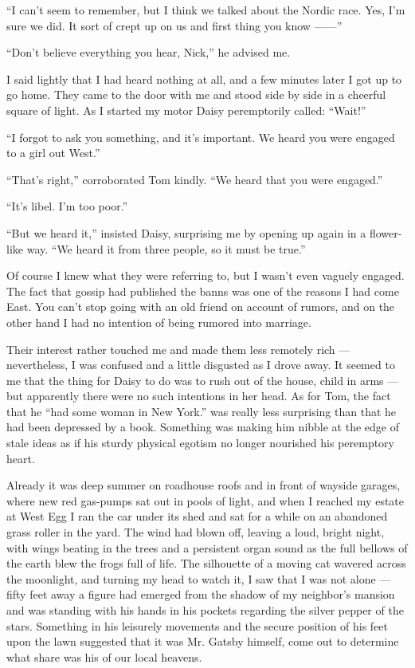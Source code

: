 \documentclass{znotebook}
\begin{document}
``I can't seem to remember, but I think we talked about the Nordic race. Yes, I'm sure we did. It sort of crept up on us and first thing you know ——''

``Don't believe everything you hear, Nick,'' he advised me.

I said lightly that I had heard nothing at all, and a few minutes later I got up to go home. They came to the door with me and stood side by side in a cheerful square of light. As I started my motor Daisy peremptorily called: ``Wait!''

``I forgot to ask you something, and it's important. We heard you were engaged to a girl out West.''

``That's right,'' corroborated Tom kindly. ``We heard that you were engaged.''

``It's libel. I'm too poor.''

``But we heard it,'' insisted Daisy, surprising me by opening up again in a flower-like way. ``We heard it from three people, so it must be true.''

Of course I knew what they were referring to, but I wasn't even vaguely engaged. The fact that gossip had published the banns was one of the reasons I had come East. You can't stop going with an old friend on account of rumors, and on the other hand I had no intention of being rumored into marriage.

Their interest rather touched me and made them less remotely rich — nevertheless, I was confused and a little disgusted as I drove away. It seemed to me that the thing for Daisy to do was to rush out of the house, child in arms — but apparently there were no such intentions in her head. As for Tom, the fact that he ``had some woman in New York.'' was really less surprising than that he had been depressed by a book. Something was making him nibble at the edge of stale ideas as if his sturdy physical egotism no longer nourished his peremptory heart.

Already it was deep summer on roadhouse roofs and in front of wayside garages, where new red gas-pumps sat out in pools of light, and when I reached my estate at West Egg I ran the car under its shed and sat for a while on an abandoned grass roller in the yard. The wind had blown off, leaving a loud, bright night, with wings beating in the trees and a persistent organ sound as the full bellows of the earth blew the frogs full of life. The silhouette of a moving cat wavered across the moonlight, and turning my head to watch it, I saw that I was not alone — fifty feet away a figure had emerged from the shadow of my neighbor's mansion and was standing with his hands in his pockets regarding the silver pepper of the stars. Something in his leisurely movements and the secure position of his feet upon the lawn suggested that it was Mr. Gatsby himself, come out to determine what share was his of our local heavens.
\end{document}
